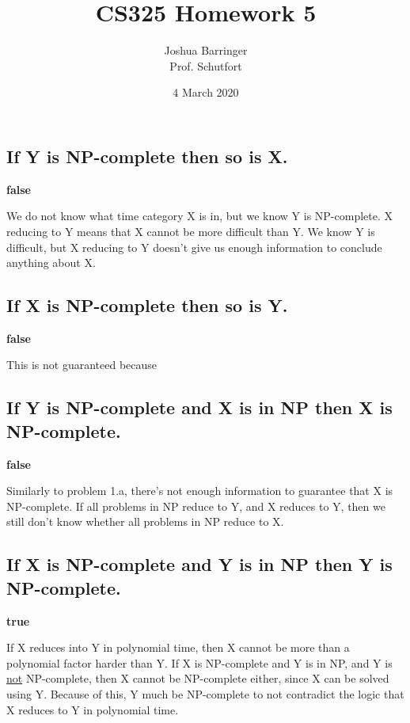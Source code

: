 \documentclass{article}
\title{CS325 Homework 5}
\author{Joshua Barringer \\
        Prof. Schutfort}
\date{4 March 2020}
\begin{document}
\maketitle

\section{}

    \subsection{If Y is NP-complete then so is X.}
    
    \textbf{false}
    
    We do not know what time category X is in, but we know Y is NP-complete.  X reducing to Y means that X cannot be more difficult than Y.  We know Y is difficult, but X reducing to Y doesn't give us enough information to conclude anything about X.

    \subsection{If X is NP-complete then so is Y.}
    
    \textbf{false}
    
    This is not guaranteed because
    
    \subsection{If Y is NP-complete and X is in NP then X is NP-complete.}
    
    \textbf{false}
    
    Similarly to problem 1.a, there's not enough information to guarantee that X is NP-complete.  If all problems in NP reduce to Y, and X reduces to Y, then we still don't know whether all problems in NP reduce to X.
    
    \subsection{If X is NP-complete and Y is in NP then Y is NP-complete.}
    
    \textbf{true}
    
    If X reduces into Y in polynomial time, then X cannot be more than a polynomial factor harder than Y.  If X is NP-complete and Y is in NP, and Y is \underline{not} NP-complete, then X cannot be NP-complete either, since X can be solved using Y.  Because of this, Y much be NP-complete to not contradict the logic that X reduces to Y in polynomial time.
    
\end{document}
